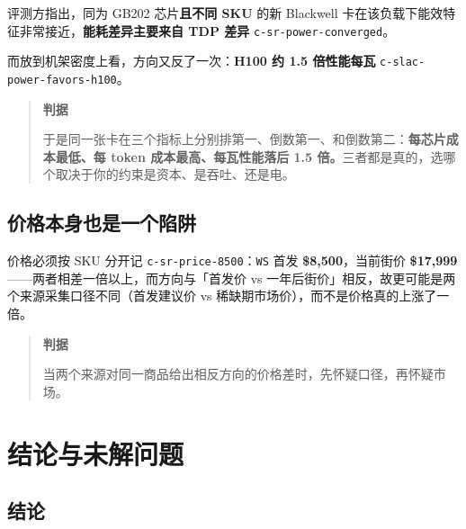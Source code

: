 评测方指出，同为 GB202 芯片\textbf{且不同 SKU} 的新 Blackwell 卡在该负载下能效特征非常接近，\textbf{能耗差异主要来自 TDP 差异} {\scriptsize\texttt{c-\hspace{0pt}sr-\hspace{0pt}power-\hspace{0pt}converged}}。


而放到机架密度上看，方向又反了一次：\textbf{H100 约 1.5 倍性能每瓦} {\scriptsize\texttt{c-\hspace{0pt}slac-\hspace{0pt}power-\hspace{0pt}favors-\hspace{0pt}h100}}。


\begin{quote}\small
\textbf{ 判据}

于是同一张卡在三个指标上分别排第一、倒数第一、和倒数第二：\textbf{每芯片成本最低、每 token 成本最高、每瓦性能落后 1.5 倍。}三者都是真的，选哪个取决于你的约束是资本、是吞吐、还是电。

\end{quote}

\subsection{价格本身也是一个陷阱}

价格必须按 SKU 分开记 {\scriptsize\texttt{c-\hspace{0pt}sr-\hspace{0pt}price-\hspace{0pt}8500}}：\texttt{WS} 首发 \textbf{\$8,500}，当前街价 \textbf{\$17,999}——两者相差一倍以上，而方向与「首发价 vs 一年后街价」相反，故更可能是两个来源采集口径不同（首发建议价 vs 稀缺期市场价），而不是价格真的上涨了一倍。


\begin{quote}\small
\textbf{ 判据}

当两个来源对同一商品给出相反方向的价格差时，先怀疑口径，再怀疑市场。

\end{quote}



\section{结论与未解问题}

\subsection{结论}

